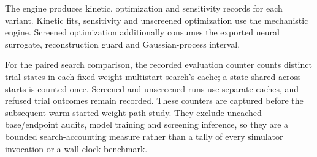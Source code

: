 \documentclass[10pt]{article}
\begin{document}
The engine produces kinetic, optimization and sensitivity records for
each variant. Kinetic fits, sensitivity and unscreened optimization use
the mechanistic engine. Screened optimization additionally consumes the
exported neural surrogate, reconstruction guard and Gaussian-process
interval.

For the paired search comparison, the recorded evaluation counter counts
distinct trial states in each fixed-weight multistart search's cache; a
state shared across starts is counted once. Screened and unscreened runs
use separate caches, and refused trial outcomes remain recorded. These
counters are captured before the subsequent warm-started weight-path
study. They exclude uncached base/endpoint audits, model training and
screening inference, so they are a bounded search-accounting measure
rather than a tally of every simulator invocation or a wall-clock
benchmark.
\end{document}

